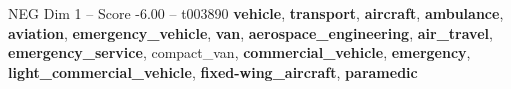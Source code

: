 \begin{textsample}{NEG Dim 1 – Score -6.00 – t003890}  \label{ex:f1_neg_004}
\textbf{vehicle}, \textbf{transport}, \textbf{aircraft}, \textbf{ambulance}, \textbf{aviation}, \textbf{emergency\_vehicle}, \textbf{van}, \textbf{aerospace\_engineering}, \textbf{air\_travel}, \textbf{emergency\_service}, compact\_van, \textbf{commercial\_vehicle}, \textbf{emergency}, \textbf{light\_commercial\_vehicle}, \textbf{fixed-wing\_aircraft}, \textbf{paramedic}

\end{textsample}
